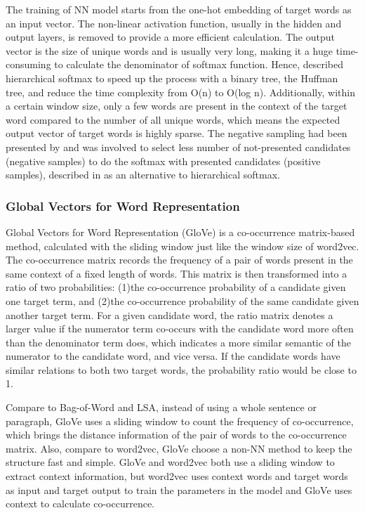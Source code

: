 The training of NN model starts from the one-hot embedding of target words as an input vector.
The non-linear activation function, usually in the hidden and output layers, is removed to provide a more efficient calculation.
The output vector is the size of unique words and is usually very long, making it a huge time-consuming to calculate the denominator of softmax function.
Hence, \cite{mikolov2013efficient} described hierarchical softmax to speed up the process with a binary tree, the Huffman tree, and reduce the time complexity from O(n) to O(log n).
Additionally, within a certain window size, only a few words are present in the context of the target word compared to the number of all unique words, which means the expected output vector of target words is highly sparse.
The negative sampling had been presented by \cite{mnih2012} \cite{gutmann2012} and was involved to select less number of not-presented candidates (negative samples) to do the softmax with presented candidates (positive samples), described in \cite{mikolov2013distributed} as an alternative to hierarchical softmax.

\subsubsection{Global Vectors for Word Representation}
Global Vectors for Word Representation (GloVe)\cite{pennington2014} is a co-occurrence matrix-based method, calculated with the sliding window just like the window size of word2vec.
The co-occurrence matrix records the frequency of a pair of words present in the same context of a fixed length of words.
This matrix is then transformed into a ratio of two probabilities: (1)the co-occurrence probability of a candidate given one target term, and (2)the co-occurrence probability of the same candidate given another target term.
For a given candidate word, the ratio matrix denotes a larger value if the numerator term co-occurs with the candidate word more often than the denominator term does, which indicates a more similar semantic of the numerator to the candidate word, and vice versa.
If the candidate words have similar relations to both two target words, the probability ratio would be close to 1.

Compare to Bag-of-Word and LSA, instead of using a whole sentence or paragraph, GloVe uses a sliding window to count the frequency of co-occurrence, which brings the distance information of the pair of words to the co-occurrence matrix.
Also, compare to word2vec, GloVe choose a non-NN method to keep the structure fast and simple.
GloVe and word2vec both use a sliding window to extract context information, but word2vec uses context words and target words as input and target output to train the parameters in the model and GloVe uses context to calculate co-occurrence.

